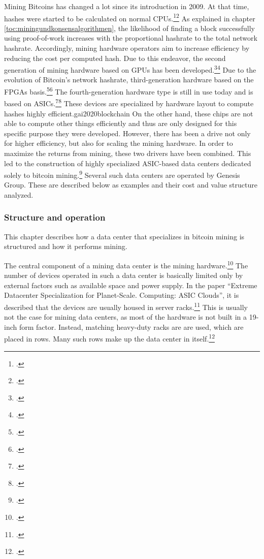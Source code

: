 Mining Bitcoins has changed a lot since its introduction in 2009. At that time, hashes were started to be calculated on
normal \acp{CPU}.\footcite[Cf.][pp. 97]{xie2018extreme}\footcite[Cf.][p. 62]{taylor2017evolution}
As explained in chapter \ref{toc:miningundkonsensalgorithmen}, the likelihood of finding a block successfully using proof-of-work
increases with the proportional hashrate to the total network hashrate.
Accordingly, mining hardware operators aim to increase efficiency by reducing the cost per
computed hash. Due to this endeavor, the second generation of mining hardware based on
\acp{GPU} has been developed.\footcite[Cf.][p. 98]{xie2018extreme}\footcite[Cf.][p. 62]{taylor2017evolution}
Due to the evolution of Bitcoin's network hashrate, third-generation hardware based on the
\acp{FPGA} basis.\footcite[Cf.][p. 98]{xie2018extreme}\footcite[Cf.][pp. 62]{taylor2017evolution}
The fourth-generation hardware type is still in use today and is based on
\acp{ASIC}.\footcite[Cf.][pp. 98]{xie2018extreme}\footcite[Cf.][p. 15]{gai2020blockchain} These devices are
specialized by hardware layout to compute hashes highly efficient.{gai2020blockchain}
On the other hand, these chips are not able to compute other things efficiently and thus are only designed for this
specific purpose they were developed. However, there has been a drive not only for higher efficiency, but also
for scaling the mining hardware. In order to maximize the returns from mining, these two drivers have been
combined. This led to the construction of highly specialized ASIC-based data centers dedicated solely to bitcoin mining.\footcite[Cf.][p. 97]{xie2018extreme}
Several such data centers are operated by Genesis Group. These are
described below as examples and their cost and value structure analyzed.

\subsubsection{Structure and operation} \label{toc:aufbauundfunktionsweise}

This chapter describes how a data center that specializes in bitcoin mining is structured
and how it performs mining.

The central component of a mining data center is the mining hardware.\footcite[Cf.][p. 327]{derks2018chaining}
The number of devices operated in such a data center is basically limited only by external factors
such as available space and power supply. In the paper "`Extreme Datacenter Specialization for Planet-Scale.
Computing: ASIC Clouds"', it is described that the devices are usually housed in server racks.\footcite[Cf.][Fig. 5]{xie2018extreme}
This is usually not the case for mining data centers,
as most of the hardware is not built in a 19-inch form factor. Instead, matching heavy-duty racks are
are used, which are placed in rows. Many such rows make up the data center in
itself.\footcite[Cf.][]{appendix:layoutkardok}

